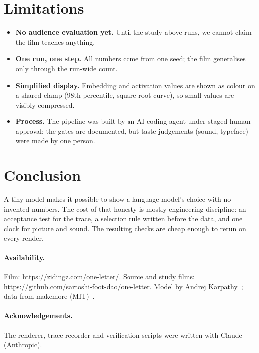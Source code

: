 \documentclass[10pt,twocolumn]{article}
\begin{document}
\section{Limitations}
\begin{itemize}
\item \textbf{No audience evaluation yet.} Until the study above runs, we cannot claim the film teaches anything.
\item \textbf{One run, one step.} All numbers come from one seed; the film generalises only through the run-wide count.
\item \textbf{Simplified display.} Embedding and activation values are shown as colour on a shared clamp
(98th percentile, square-root curve), so small values are visibly compressed.
\item \textbf{Process.} The pipeline was built by an AI coding agent under staged human approval;
the gates are documented, but taste judgements (sound, typeface) were made by one person.
\end{itemize}

\section{Conclusion}
A tiny model makes it possible to show a language model's choice with no invented numbers.
The cost of that honesty is mostly engineering discipline: an acceptance test for the trace, a selection rule
written before the data, and one clock for picture and sound. The resulting checks are cheap enough to rerun on every render.

\paragraph{Availability.}\raggedright Film: \url{https://zidingz.com/one-letter/}. Source and study films: \url{https://github.com/sartoshi-foot-dao/one-letter}.
Model by Andrej Karpathy~\cite{karpathy2026microgpt}; data from makemore (MIT)~\cite{makemore}.

\paragraph{Acknowledgements.} The renderer, trace recorder and verification scripts were written with Claude (Anthropic).
\end{document}
